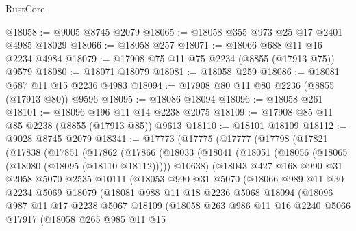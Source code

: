 \begin{lexlean}{RustCore}
\begin{coremodule}
@18058 := @9005 @8745 @2079
@18065 := @18058 @355 @973 @25 @17 @2401 @4985 @18029
@18066 := @18058 @257
@18071 := @18066 @688 @11 @16 @2234 @4984
@18079 := @17908 @75 @11 @75 @2234 (@8855 (@17913 @75)) @9579
@18080 := @18071 @18079
@18081 := @18058 @259
@18086 := @18081 @687 @11 @15 @2236 @4983
@18094 := @17908 @80 @11 @80 @2236 (@8855 (@17913 @80)) @9596
@18095 := @18086 @18094
@18096 := @18058 @261
@18101 := @18096 @196 @11 @14 @2238 @2075
@18109 := @17908 @85 @11 @85 @2238 (@8855 (@17913 @85)) @9613
@18110 := @18101 @18109
@18112 := @9028 @8745 @2079
@18341 := @17773
    (@17775
      (@17777
        (@17798
          (@17821
            (@17838
              (@17851
                (@17862
                  (@17866
                    (@18033
                      (@18041
                        (@18051 (@18056 (@18065 (@18080 (@18095 (@18110 @18112))))) @10638)
                        (@18043
                          @427
                          @168
                          @990
                          @31
                          @2058
                          @5070
                          @2535
                          @10111
                          (@18053
                            @990
                            @31
                            @5070
                            (@18066
                              @989
                              @11
                              @30
                              @2234
                              @5069
                              @18079
                              (@18081
                                @988
                                @11
                                @18
                                @2236
                                @5068
                                @18094
                                (@18096
                                  @987
                                  @11
                                  @17
                                  @2238
                                  @5067
                                  @18109
                                  (@18058
                                    @263
                                    @986
                                    @11
                                    @16
                                    @2240
                                    @5066
                                    @17917
                                    (@18058
                                      @265
                                      @985
                                      @11
                                      @15

\end{coremodule}
\end{lexlean}
